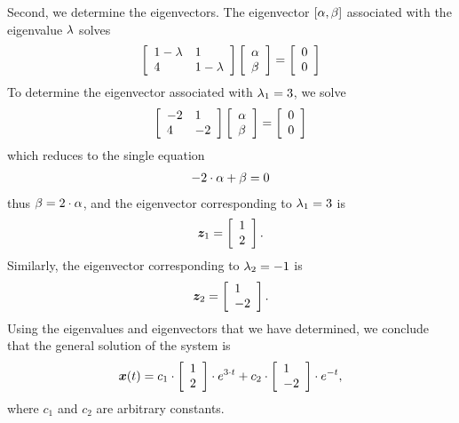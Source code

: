 \documentclass[letterpaper,12pt,leqno]{article}
\begin{document}
\begin{enumerate}
Second, we determine the eigenvectors. The eigenvector $[\alpha,\beta]$ associated with the eigenvalue $\lambda$ solves
\begin{align*}
\left[ 
\begin{array}{ll}
1-\lambda & 1 \\ 
4 & 1-\lambda 
\end{array}
 \right] \left[ 
\begin{array}{l}
\alpha \\ 
\beta 
\end{array} \right] =\left[ 
\begin{array}{l}
0\\ 
0
\end{array} \right]
\end{align*}
To determine the eigenvector associated with $\lambda_{1}=3$, we solve 
\begin{align*}
\left[ \begin{array}{ll}
-2& 1\\ 
4 & -2
\end{array}
 \right] \left[ 
\begin{array}{l}
\alpha \\ 
\beta
\end{array} \right] =\left[ 
\begin{array}{l}
0\\ 
0
\end{array} \right]
\end{align*}
which reduces to the single equation
\begin{align*}
-2\cdot \alpha +\beta =0
\end{align*}
thus $\beta =2\cdot \alpha $, and the eigenvector corresponding to $\lambda_{1}=3$ is 
\begin{align*}
\bm{z}_{1}=\left[ 
\begin{array}{l}
1 \\ 
2
\end{array} \right] .
\end{align*}
Similarly, the eigenvector corresponding to $\lambda_{2}=-1$ is 
\begin{align*}
\bm{z}_{2}=\left[ 
\begin{array}{l}
1 \\ 
-2
\end{array} \right].
\end{align*}
Using the eigenvalues and eigenvectors that we have determined, we conclude that the general solution of the system is 
\begin{align*}
\bm{x}(t)=c_{1}\cdot \left[ 
\begin{array}{l}
1 \\ 
2
\end{array} \right] \cdot e^{3\cdot t}+c_{2}\cdot \left[ 
\begin{array}{l}
1 \\ 
-2
\end{array} \right]\cdot e^{-t},
\end{align*}
where $c_{1}$ and $c_{2}$ are arbitrary constants. 


\end{enumerate}
\end{document}
